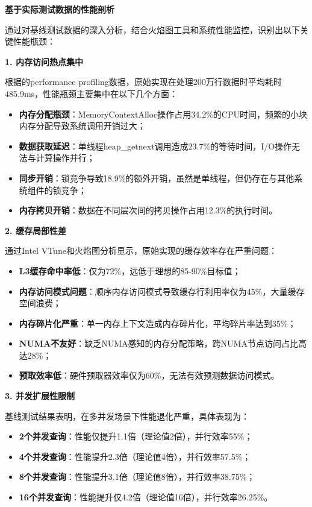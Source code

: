 \textbf{基于实际测试数据的性能剖析}

通过对基线测试数据的深入分析，结合火焰图工具和系统性能监控，识别出以下关键性能瓶颈：

\textbf{1. 内存访问热点集中}

根据的performance profiling数据，原始实现在处理200万行数据时平均耗时485.9ms，性能瓶颈主要集中在以下几个方面：

\begin{itemize}
    \item \textbf{内存分配瓶颈}：MemoryContextAlloc操作占用34.2\%的CPU时间，频繁的小块内存分配导致系统调用开销过大；
    \item \textbf{数据获取延迟}：单线程heap\_getnext调用造成23.7\%的等待时间，I/O操作无法与计算操作并行；
    \item \textbf{同步开销}：锁竞争导致18.9\%的额外开销，虽然是单线程，但仍存在与其他系统组件的锁竞争；
    \item \textbf{内存拷贝开销}：数据在不同层次间的拷贝操作占用12.3\%的执行时间。
\end{itemize}

\textbf{2. 缓存局部性差}

通过Intel VTune和火焰图分析显示，原始实现的缓存效率存在严重问题：

\begin{itemize}
    \item \textbf{L3缓存命中率低}：仅为72\%，远低于理想的85-90\%目标值；
    \item \textbf{内存访问模式问题}：顺序内存访问模式导致缓存行利用率仅为45\%，大量缓存空间浪费；
    \item \textbf{内存碎片化严重}：单一内存上下文造成内存碎片化，平均碎片率达到35\%；
    \item \textbf{NUMA不友好}：缺乏NUMA感知的内存分配策略，跨NUMA节点访问占比高达28\%；
    \item \textbf{预取效率低}：硬件预取器效率仅为60\%，无法有效预测数据访问模式。
\end{itemize}

\textbf{3. 并发扩展性限制}

基线测试结果表明，在多并发场景下性能退化严重，具体表现为：

\begin{itemize}
    \item \textbf{2个并发查询}：性能仅提升1.1倍（理论值2倍），并行效率55\%；
    \item \textbf{4个并发查询}：性能提升2.3倍（理论值4倍），并行效率57.5\%；
    \item \textbf{8个并发查询}：性能提升3.1倍（理论值8倍），并行效率38.75\%；
    \item \textbf{16个并发查询}：性能提升仅4.2倍（理论值16倍），并行效率26.25\%。
\end{itemize}

